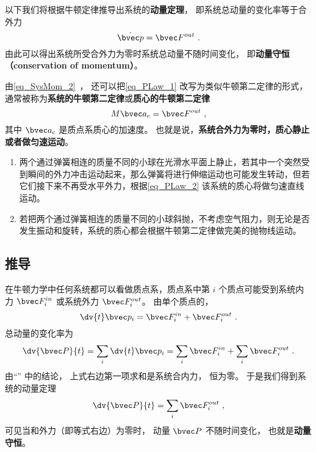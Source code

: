 
以下我们将根据牛顿定律推导出系统的\textbf{动量定理}， 即系统总动量的变化率等于合外力
\begin{equation}\label{eq_PLaw_1}
\dot {\bvec p} = \bvec F^{out}~.
\end{equation}
由此可以得出系统所受合外力为零时系统总动量不随时间变化， 即\textbf{动量守恒（conservation of momentum）}。

由\autoref{eq_SysMom_2}~， 还可以把\autoref{eq_PLaw_1} 改写为类似牛顿第二定律的形式， 通常被称为\textbf{系统的牛顿第二定律}或\textbf{质心的牛顿第二定律}
\begin{equation}\label{eq_PLaw_2}
M \bvec a_c = \bvec F^{out}~,
\end{equation}
其中 $\bvec a_c$ 是质点系质心的加速度。 也就是说，\textbf{系统合外力为零时，质心静止或者做匀速运动}。

\begin{example}{}
\begin{enumerate}
\item 两个通过弹簧相连的质量不同的小球在光滑水平面上静止，若其中一个突然受到瞬间的外力冲击运动起来，那么弹簧将进行伸缩运动也可能发生转动，但若它们接下来不再受水平外力，根据\autoref{eq_PLaw_2} 该系统的质心将做匀速直线运动。
\item 若把两个通过弹簧相连的质量不同的小球斜抛，不考虑空气阻力，则无论是否发生振动和旋转，系统的质心都会根据牛顿第二定律做完美的抛物线运动。
\end{enumerate}
\end{example}

\subsection{推导}
在牛顿力学中任何系统都可以看做质点系，质点系中第 $i$ 个质点可能受到系统内力 $\bvec F_i^{in}$ 或系统外力 $\bvec F_i^{out}$。 由单个质点的，
\begin{equation}
\dv{t} \bvec p_i = \bvec F_i^{in} + \bvec F_i^{out}~.
\end{equation}
总动量的变化率为
\begin{equation}
\dv{\bvec P}{t} = \sum_i \dv{t} \bvec p_i  = \sum_i \bvec F_i^{in}  + \sum_i \bvec F_i^{out}~.
\end{equation}
由“” 中的结论， 上式右边第一项求和是系统合内力， 恒为零。 于是我们得到系统的动量定理
\begin{equation}
\dv{\bvec P}{t} = \sum_i \bvec F_i^{out}~,
\end{equation}
可见当和外力（即等式右边）为零时， 动量 $\bvec P$ 不随时间变化， 也就是\textbf{动量守恒}。

